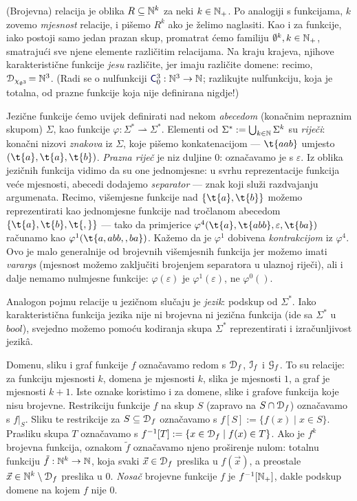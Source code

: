 (Brojevna) relacija je oblika $R\subseteq{\mathbb N}^k$ za neki $k\in{\mathbb N}_+$. Po analogiji s funkcijama, $k$ zovemo \emph{mjesnost} relacije, i pišemo $R^k$ ako je želimo naglasiti. Kao i za funkcije, iako postoji samo jedan prazan skup, promatrat ćemo familiju $\emptyset^k,k\in{\mathbb N}_+$, smatrajući sve njene elemente različitim relacijama. Na kraju krajeva, njihove karakteristične funkcije \emph{jesu} različite, jer imaju različite domene: recimo, $\mathcal D_{\chi_{\emptyset^3}}\!={\mathbb N}^3$. (Radi se o nulfunkciji $\f C_0^3:\N^3\to\N$; razlikujte nulfunkciju, koja je totalna, od prazne funkcije koja nije definirana nigdje!)

Jezične funkcije ćemo uvijek definirati nad nekom \emph{abecedom} (konačnim nepraznim skupom) $\Sigma$, kao funkcije $\varphi:\Sigma^*\rightharpoonup\Sigma^*$. Elementi od $\Sigma^*:=\bigcup_{k\in{\mathbb N}}\Sigma^k$ su \emph{riječi}: konačni nizovi \emph{znakova} iz $\Sigma$, koje pišemo konkatenacijom --- $\t{aab}$ umjesto $(\t{a},\t{a},\t{b})$. \emph{Prazna riječ} je niz duljine $0$: označavamo je s $\varepsilon$. Iz oblika jezičnih funkcija vidimo da su one jednomjesne: u svrhu reprezentacije funkcija veće mjesnosti, abecedi dodajemo \emph{separator} --- znak koji služi razdvajanju argumenata. Recimo, višemjesne funkcije nad $\{\t{a},\t{b}\}$ možemo reprezentirati kao jednomjesne funkcije nad tročlanom abecedom $\{\t{a},\t{b},\t{,}\}$ --- tako da primjerice $\varphi^4(\t{a},\t{abb},\varepsilon,\t{ba})$ računamo kao $\varphi^1(\t{a{},{}a{}b{}b{},{},{}b{}a})$. Kažemo da je $\varphi^1$ dobivena \emph{kontrakcijom} iz $\varphi^4$. Ovo je malo generalnije od brojevnih višemjesnih funkcija jer možemo imati \emph{varargs} (mjesnost možemo zaključiti brojenjem separatora u ulaznoj ri\-je\-či), ali i dalje nemamo nulmjesne funkcije: $\varphi(\varepsilon)$ je $\varphi^1(\varepsilon)$, ne $\varphi^0()$. %

Analogon pojmu relacije u jezičnom slučaju je \emph{jezik}: podskup od $\Sigma^*$. Iako karakteristična funkcija jezika nije ni brojevna ni jezična funkcija (ide sa $\Sigma^*$ u $bool$), svejedno možemo pomoću kodiranja skupa $\Sigma^*$ reprezentirati i izračunljivost jezikâ. %

Domenu, sliku i graf funkcije $f$ označavamo redom s $\mathcal D_{f}$, $\mathcal I_{f}$ i $\mathcal G_{f}$. To su relacije: za funkciju mjesnosti $k$, domena je mjesnosti $k$, slika je mjesnosti $1$, a graf je mjesnosti $k+1$. Iste oznake koristimo i za domene, slike i grafove funkcija koje nisu brojevne. Restrikciju funkcije $f$ na skup $S$ (zapravo na $S\cap\mathcal D_{f}$) označavamo s $f|_S$. Sliku te restrikcije za $S\subseteq\mathcal D_{f}$ označavamo s $f[S]:=\{f(x)\mid x\in S\}$. Prasliku skupa $T$ označavamo s $f^{-1}[T]:=\{x\in\mathcal D_{f}\mid f(x)\in T\}$. Ako je $f^k$ brojevna funkcija, oznakom $\tilde f$ označavamo njeno proširenje nulom: totalnu funkciju $\tilde{f}:{\mathbb N}^k\to{\mathbb N}$, koja svaki $\vec x\in\mathcal D_{f}$ preslika u $f(\vec x)$, a preostale $\vec x\in{\mathbb N}^k\setminus\mathcal D_{f}$ preslika u $0$. \emph{Nosač} brojevne funkcije $f$ je $f^{-1}[{\mathbb N}_+]$, dakle podskup domene na kojem $f$ nije $0$.

